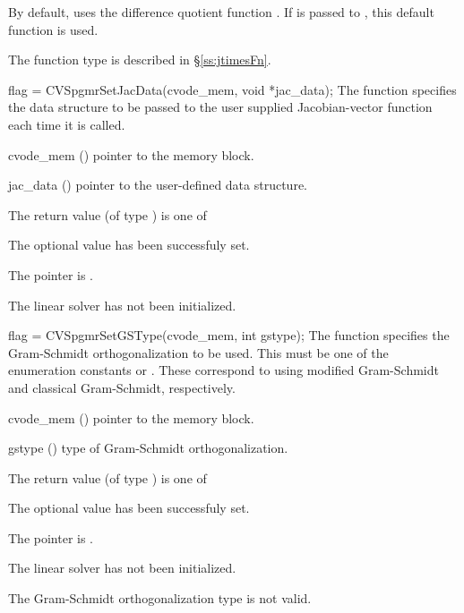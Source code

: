 {
  By default, {\cvspgmr} uses the difference quotient function .
  If  is passed to , this default function is used.

  The function type  is described in \S\ref{ss:jtimesFn}.
}
{
  flag = CVSpgmrSetJacData(cvode\_mem, void *jac\_data);
}
{
  The function  specifies the data structure
  to be passed to the user supplied Jacobian-vector
  function each time it is called.
}
{
  \begin{args}
  \item[cvode\_mem] ()
    pointer to the {\cvodes} memory block.
  \item[jac\_data] ()
     pointer to the user-defined data structure.
  \end{args}
}
{
  The return value  (of type ) is one of
  \begin{args}
  \item[\Id{SUCCESS}] 
    The optional value has been successfuly set.
  \item[\Id{LIN\_NO\_MEM}]
    The  pointer is .
  \item[\Id{LIN\_NO\_LMEM}]
    The {\cvspgmr} linear solver has not been initialized.
  \end{args}
}
{}
{
  flag = CVSpgmrSetGSType(cvode\_mem, int gstype);
}
{
  The function  specifies the 
  Gram-Schmidt orthogonalization to be used. 
  This must be one of the enumeration constants 
  or . These correspond to using modified Gram-Schmidt 
  and classical Gram-Schmidt, respectively. 
}
{
  \begin{args}
  \item[cvode\_mem] ()
    pointer to the {\cvodes} memory block.
  \item[gstype] ()
    type of Gram-Schmidt orthogonalization.
  \end{args}
}
{
  The return value  (of type ) is one of
  \begin{args}
  \item[\Id{SUCCESS}] 
    The optional value has been successfuly set.
  \item[\Id{LIN\_NO\_MEM}]
    The  pointer is .
  \item[\Id{LIN\_NO\_LMEM}]
    The {\cvspgmr} linear solver has not been initialized.
  \item[\Id{LIN\_ILL\_INPUT}]
    The Gram-Schmidt orthogonalization type  is not valid.
  \end{args}
}
